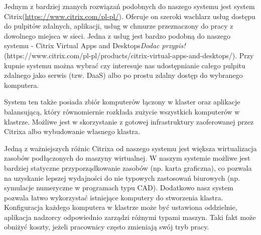 \documentclass[../wstep.tex]{subfiles}
\begin{document}
	
Jednym z bardziej znanych rozwiązań podobnych do naszego systemu jest system Citrix(\url{https://www.citrix.com/pl-pl/}).
Oferuje on szeroki wachlarz usług dostępu do pulpitów zdalnych, aplikacji, usług w chmurze przeznaczony do pracy z dowolnego miejsca w sieci.
Jedna z usług jest bardzo podobną do naszego systemu - Citrix Virtual Apps and Desktops\textit{Dodac przypis!}(https://www.citrix.com/pl-pl/products/citrix-virtual-apps-and-desktops/).
Przy kupnie systemu można wybrać czy interesuje nas udostępnianie całego pulpitu zdalnego jako serwis (tzw. DaaS) albo po prostu zdalny dostęp do wybranego komputera.

System ten także posiada zbiór komputerów łączony w klaster oraz aplikacje balansującą, który równomiernie rozkłada zużycie wszystkich komputerów w klastrze.
Możliwe jest w skorzystanie z gotowej infrastruktury zaoferowanej przez Citrixa albo wybudowanie własnego klastra. 

Jedną z ważniejszych różnic Citrixa od naszego systemu jest większa wirtualizacja zasobów podłączonych do maszyny wirtualnej.
W naszym systemie możliwe jest bardziej statyczne przyporządkowanie zasobów (np. karta graficzna), co pozwala na uzyskanie lepszej wydajności do nie typowych zastosowań biurowych (np. symulacje numeryczne w programach typu CAD).
Dodatkowo nasz system pozwala łatwo wykorzystać istniejące komputery do stworzenia klastra.
Konfiguracja każdego komputera w klastrze może być ustawiona oddzielnie, aplikacja nadzorcy odpowiednio zarządzi różnymi typami maszyn.
Taki fakt może obniżyć koszty, jeżeli pracownicy często zmieniają swój tryb pracy.
	
\end{document}
